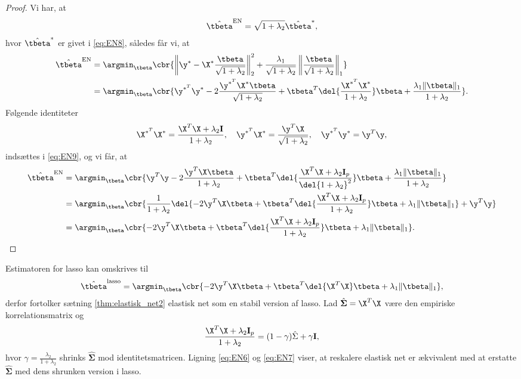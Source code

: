 \begin{proof}
Vi har, at
\begin{align*}
\hat{\tbeta}^\text{EN} = \sqrt{1+\lambda_2} \hat{\tbeta}^*,
\end{align*}
hvor \(\hat{\tbeta}^*\) er givet i \eqref{eq:EN8}, således får vi, at
\begin{align}
\hat{\tbeta}^\text{EN} &= \argmin_{\tbeta} \cbr{\left\Vert \y^* - \X^* \frac{\tbeta}{\sqrt{1+\lambda_2}} \right\Vert_2^2 + \frac{\lambda_1}{\sqrt{1+\lambda_2}} \left\Vert \frac{\tbeta}{\sqrt{1+\lambda_2}} \right\Vert_1} \nonumber \\
&=\argmin_{\tbeta} \cbr{ \y^{*^T} \y^* - 2 \frac{\y^{*^T} \X^* \tbeta}{\sqrt{1+\lambda_2}} + \tbeta^T \del{\frac{\X^{*^T} \X^*}{1+\lambda_2}} \tbeta + \frac{\lambda_1 \Vert \tbeta \Vert_1}{1+\lambda_2}}. \label{eq:EN9}
\end{align}
Følgende identiteter
\begin{align*}
\X^{*^T} \X^* = \frac{\X^T \X + \lambda_2 \mathbf{I}}{1+ \lambda_2}, \quad \y^{*^T} \X^* = \frac{\y^T \X}{\sqrt{1+\lambda_2}} , \quad \y^{*^T} \y^* = \y^T \y, 
\end{align*}
indsættes i \eqref{eq:EN9}, og vi får, at
\begin{align*}
\hat{\tbeta}^\text{EN} &= \argmin_{\tbeta} \cbr{\y^T \y - 2 \frac{\y^T \X \tbeta}{1+\lambda_2} + \tbeta^T \del{\frac{\X^T \X + \lambda_2 \mathbf{I}_p}{\del{1+\lambda_2}^2}} \tbeta + \frac{\lambda_1 \Vert \tbeta \Vert_1}{1+\lambda_2}} \\ 
&= \argmin_{\tbeta} \cbr{\frac{1}{1+\lambda_2} \del{- 2 \y^T \X \tbeta + \tbeta^T \del{\frac{\X^T \X + \lambda_2 \mathbf{I}_p}{1+ \lambda_2}} \tbeta + \lambda_1 \Vert \tbeta \Vert_1} + \y^T \y} \\
&= \argmin_{\tbeta} \cbr{- 2 \y^T \X \tbeta + \tbeta^T \del{\frac{\X^T \X + \lambda_2 \mathbf{I}_p}{1+ \lambda_2}} \tbeta + \lambda_1 \Vert \tbeta \Vert_1}.
\end{align*}
\end{proof}
%
Estimatoren for lasso kan omskrives til
\begin{align}
\hat{\tbeta}^\text{lasso} = \argmin_{\tbeta} \cbr{ - 2 \y^T \X \tbeta + \tbeta^T \del{\X^T \X} \tbeta  + \lambda_1 \Vert \tbeta \Vert_1}, \label{eq:EN7}
\end{align}
derfor fortolker sætning \ref{thm:elastisk_net2} elastisk net som en stabil version af lasso.
Lad \(\hat{\boldsymbol{\Sigma}} = \X^T \X\) være den empiriske korrelationsmatrix og
\begin{align*}
\frac{\X^T \X + \lambda_2 \mathbf{I}_p}{1 + \lambda_2} = (1-\gamma) \hat{\Sigma} + \gamma \mathbf{I},
\end{align*}
hvor \(\gamma=\frac{\lambda_2}{1+\lambda_2}\) shrinks \(\hat{\boldsymbol{\Sigma}}\) mod identitetsmatricen.
Ligning \eqref{eq:EN6} og \eqref{eq:EN7} viser, at reskalere elastisk net er ækvivalent med at erstatte \(\hat{\boldsymbol{\Sigma}}\) med dens shrunken version i lasso.


